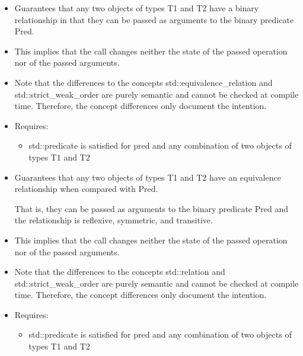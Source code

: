 
\begin{itemize}
\item
Guarantees that any two objects of types T1 and T2 have a binary relationship in that they can be passed as arguments to the binary predicate Pred.

\item
This implies that the call changes neither the state of the passed operation nor of the passed arguments.

\item
Note that the differences to the concepts std::equivalence\_relation and std::strict\_weak\_order are purely semantic and cannot be checked at compile time. Therefore, the concept differences only document the intention.

\item
Requires:
\begin{itemize}
\item
std::predicate is satisfied for pred and any combination of two objects of types T1 and T2
\end{itemize}
\end{itemize}


\begin{itemize}
\item
Guarantees that any two objects of types T1 and T2 have an equivalence relationship when compared with Pred.

That is, they can be passed as arguments to the binary predicate Pred and the relationship is reflexive, symmetric, and transitive.

\item
This implies that the call changes neither the state of the passed operation nor of the passed arguments.

\item
Note that the differences to the concepts std::relation and std::strict\_weak\_order are purely semantic and cannot be checked at compile time. Therefore, the concept differences only document the intention.

\item
Requires:
\begin{itemize}
\item
std::predicate is satisfied for pred and any combination of two objects of types T1 and T2
\end{itemize}
\end{itemize}

